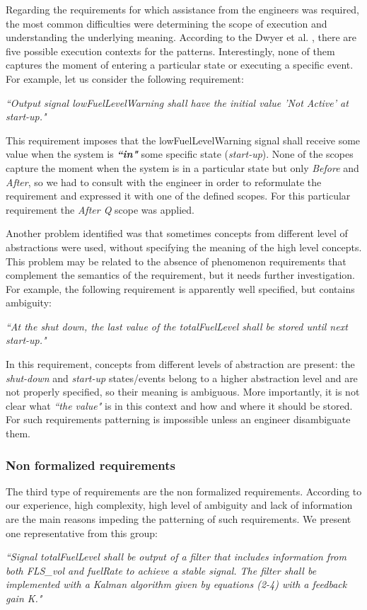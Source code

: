 \documentclass[conference]{IEEEtran}
\begin{document}
Regarding the requirements for which assistance from the engineers was required, the most common difficulties were determining the scope of execution and understanding the underlying meaning. According to the Dwyer et al. \cite{Dwyer99sps}, there are five possible execution contexts for the patterns. Interestingly, none of them captures the moment of entering a particular state or executing a specific event. For example, let us consider the following requirement:
\begin{center}
\textit{``Output signal lowFuelLevelWarning shall have the initial value 'Not Active' at start-up."}
\end{center} 
This requirement imposes that the lowFuelLevelWarning signal shall receive some value when the system is \textbf{\textit{``in"}} some specific state (\textit{start-up}). None of the scopes capture the moment when the system is in a particular state but only \textit{Before} and \textit{After}, so we had to consult with the engineer in order to reformulate the requirement and expressed it with one of the defined scopes. For this particular requirement the \textit{After Q} scope was applied.

Another problem identified was that sometimes concepts from different level of abstractions were used, without specifying the meaning of the high level concepts. This problem may be related to the absence of phenomenon requirements that complement the semantics of the requirement, but it needs further investigation. For example, the following requirement is apparently well specified, but contains ambiguity:
\begin{center}
 \textit{``At the shut down, the last value of the totalFuelLevel shall be stored until next start-up."}
\end{center}

In this requirement, concepts from different levels of abstraction are present: the \textit{shut-down} and \textit{start-up} states/events belong to a higher abstraction level and are not properly specified, so their meaning is  ambiguous. More importantly, it is not clear what \textit{``the value"} is in this context and how and where it should be stored. For such requirements patterning is impossible unless an engineer disambiguate them.

\subsubsection*{\textbf{Non formalized requirements}}
The third type of requirements are the non formalized requirements. According to our experience, high complexity, high level of ambiguity and lack of information are the main reasons impeding the patterning of such requirements. We present one representative from this group:
\begin{center}
\textit{``Signal totalFuelLevel shall be output of a filter that includes information from both FLS\_vol and fuelRate to achieve a stable signal. The filter shall be implemented with a Kalman algorithm given by equations (2-4) with a feedback gain K."}\\
\end{center}
\end{document}
